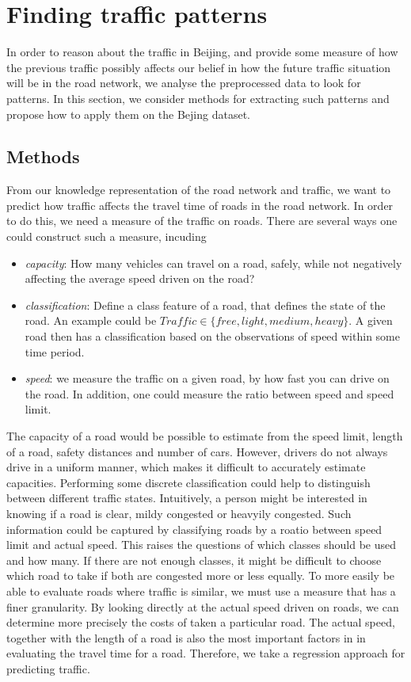\section{Finding traffic patterns}
In order to reason about the traffic in Beijing, and provide some measure of how the previous traffic possibly affects our belief in how the future traffic situation will be in the road network, we analyse the preprocessed data to look for patterns. In this section, we consider methods for extracting such patterns and propose how to apply them on the Bejing dataset.
\subsection{Methods}\label{patterns:methods}
From our knowledge representation of the road network and traffic, we want to predict how traffic affects the travel time of roads in the road network. In order to do this, we need a measure of the traffic on roads. There are several ways one could construct such a measure, incuding
\begin{itemize}
\item \emph{capacity}: How many vehicles can travel on a road, safely, while not negatively affecting the average speed driven on the road?
\item \emph{classification}: Define a class feature of a road, that defines the state of the road. An example could be $Traffic \in \{free, light, medium, heavy\}$. A given road then has a classification based on the observations of speed within some time period.
\item \emph{speed}: we measure the traffic on a given road, by how fast you can drive on the road. In addition, one could measure the ratio between speed and speed limit.
\end{itemize}
The capacity of a road would be possible to estimate from the speed limit, length of a road, safety distances and number of cars. However, drivers do not always drive in a uniform manner, which makes it difficult to accurately estimate capacities.
Performing some discrete classification could help to distinguish between different traffic states. Intuitively, a person might be interested in knowing if a road is clear, mildy congested or heavyily congested. Such information could be captured by classifying roads by a roatio between speed limit and actual speed. This raises the questions of which classes should be used and how many. If there are not enough classes, it might be difficult to choose which road to take if both are congested more or less equally.
To more easily be able to evaluate roads where traffic is similar, we must use a measure that has a finer granularity. By looking directly at the actual speed driven on roads, we can determine more precisely the costs of taken a particular road. The actual speed, together with the length of a road is also the most important factors in in evaluating the travel time for a road. Therefore, we take a regression approach for predicting traffic.
